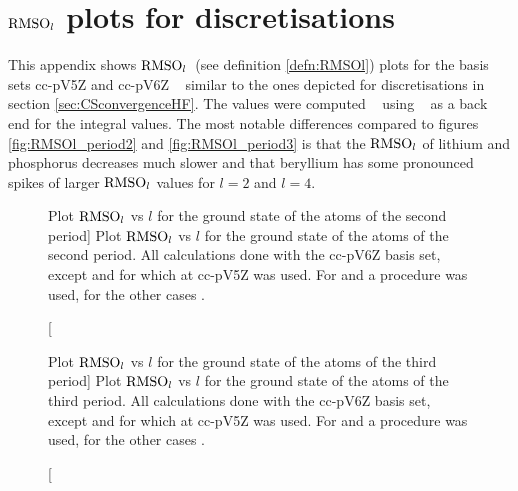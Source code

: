 \chapter{$\text{RMSO}_l$ plots for \cGTO discretisations}
\label{apx:GaussianUHF}

This appendix shows $\text{RMSO}_l$~(see definition \vref{defn:RMSOl})
plots for the \cGTO basis sets
cc-pV5Z and cc-pV6Z%
~\cite{Dunning1989,Woon1993,Wilson1996,VanMourik2000,Prascher2011}
similar to the ones depicted for \CS discretisations
in section \vref{sec:CSconvergenceHF}.
The values were computed \molsturm~\cite{molsturmWeb,molsturmDesign}
using \libint~\cite{Libint2_231} as a back end
for the integral values.
The most notable differences compared to figures \ref{fig:RMSOl_period2}
and \vref{fig:RMSOl_period3}
is that the $\text{RMSO}_l$ of lithium and phosphorus
decreases much slower and
that beryllium has some pronounced spikes of larger $\text{RMSO}_l$
values for $l=2$ and $l=4$.

\begin{figure}[hp!]
	\centering
	\caption
	[Plot $\text{RMSO}_l$ vs $l$ for the \HF ground state of the atoms of the second period]
	{
		Plot $\text{RMSO}_l$ vs $l$ for the \HF ground state
		of the atoms of the second period.
		All calculations done with the cc-pV6Z basis set,
		except  and 
		for which at cc-pV5Z was used.
		For  and  a \RHF procedure was used,
		for the other cases \UHF.
	}
	\label{fig:RMSO_period2_l}
\end{figure}

\begin{figure}[hp!]
	\centering
	\caption
	[Plot $\text{RMSO}_l$ vs $l$ for the \HF ground state of the atoms of the third period]
	{
		Plot $\text{RMSO}_l$ vs $l$ for the \HF ground state
		of the atoms of the third period.
		All calculations done with the cc-pV6Z basis set,
		except  and 
		for which at cc-pV5Z was used.
		For  and  a \RHF procedure was used,
		for the other cases \UHF.
	}
	\label{fig:RMSO_period3_l}
\end{figure}

%

